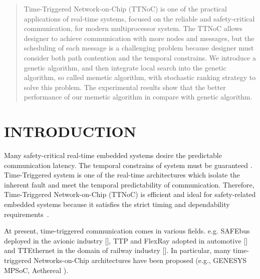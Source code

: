 \documentclass[conference]{IEEEtran}
\begin{document}
\begin{abstract}
Time-Triggered Network-on-Chip (TTNoC) is one of the practical applications of real-time systems, focused on the reliable and safety-critical communication, for modern multiprocessor system. The TTNoC allows designer to achieve communication with more nodes and messages, but the scheduling of each message is a challenging problem because designer must consider both path contention and the temporal constrains. We introduce a genetic algorithm, and then integrate local search into the genetic algorithm, so called memetic algorithm, with stochastic ranking strategy to solve this problem. The experimental results show that the better performance of our memetic algorithm in compare with genetic algorithm.
\end{abstract}

%
\IEEEpeerreviewmaketitle



\section{INTRODUCTION}
Many safety-critical real-time embedded systems desire the predictable communication latency. The temporal constrains of system must be guaranteed \cite{DBLP:conf/date/HuangBRBK12}. Time-Triggered system is one of the real-time architectures which isolate the inherent fault and meet the temporal predictability of communication. Therefore, Time-Triggered Network-on-Chip (TTNoC) is efficient and ideal for safety-related embedded systems because it satisfies the strict timing and dependability requirements~\cite{DBLP:journals/afp/Noce16}.

At present, time-triggered communication comes in various fields. e.g. SAFEbus deployed in the avionic industry [], TTP and FlexRay adopted in automotive  [] and TTEthernet in the domain of railway industry []. In particular, many time-triggered Networks-on-Chip architectures have been proposed (e.g., GENESYS MPSoC, Aethereal \cite{DBLP:conf/dac/2010}).
\end{document}
